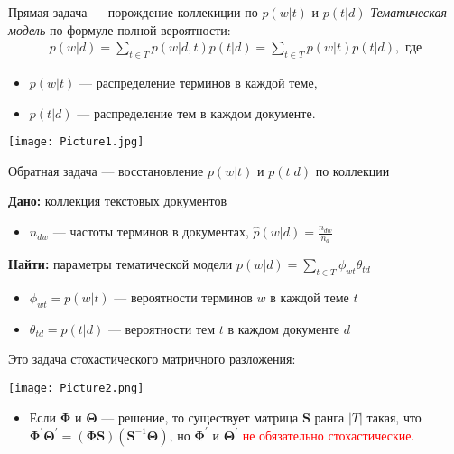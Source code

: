 \documentclass[unicode,9pt, pdf]{beamer}
\begin{document}
   \begin{frame}{Прямая задача --- порождение коллекиции по $p(w|t)$ и $p(t|d)$}
   \textit{Тематическая модель} по формуле полной вероятности:
   \begin{gather*}
       p(w|d) = \sum_{t \in T} p(w|d,t)p(t|d) = \sum_{t \in T} p(w|t) p(t|d), \text{ где}
   \end{gather*}
\begin{itemize}
    \item $p(w|t)$ --- распределение терминов в каждой теме,
    \item $p(t|d)$ --- распределение тем в каждом документе.
\end{itemize}
   	\begin{center}
		\centering
		\texttt{[image: Picture1.jpg]}
	\end{center}
   
   \end{frame}
   
   \begin{frame}{Обратная задача --- восстановление $p(w|t)$ и $p(t|d)$ по коллекции}
   
   \textbf{Дано:} коллекция текстовых документов
       \begin{itemize}
           \item $n_{d w}$ --- частоты терминов в документах, $\hat{p}(w|d) = \frac{n_{d w}}{n_{d}}$
       \end{itemize}
      
      \textbf{Найти:} параметры тематической модели $p(w|d) = \sum_{t \in T} \phi_{w t} \theta_{t d}$
      \begin{itemize}
          \item $\phi_{w t} = p(w|t)$ --- вероятности терминов $w$ в каждой теме $t$
          \item $\theta_{t d} = p(t|d)$ --- вероятности тем $t$ в каждом документе $d$
      \end{itemize}
      
      Это задача стохастического матричного разложения:
      \begin{center}
		\centering
		\texttt{[image: Picture2.png]}
	\end{center}
	
	\begin{itemize}
	    \item Если $\mathbf{\Phi}$ и $\mathbf{\Theta}$ --- решение, то
	    существует матрица $\mathbf{S}$ ранга $|T|$ такая, что $\mathbf{\Phi}^{'}\mathbf{\Theta}^{'} = (\mathbf{\Phi} \mathbf{S})(\mathbf{S}^{-1}\mathbf{\Theta})$, но $\mathbf{\Phi}^{'}$ и $\mathbf{\Theta}^{'}$ \textcolor{red}{не обязательно стохастические.}
	\end{itemize}
	
	

      


   \end{frame}
   
\end{document}
